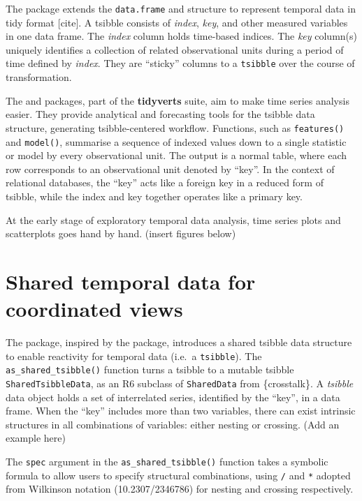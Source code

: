The  package extends the \texttt{data.frame} and
 structure to represent temporal data in tidy format
{[}cite{]}. A tsibble consists of \emph{index}, \emph{key}, and other
measured variables in one data frame. The \emph{index} column holds
time-based indices. The \emph{key} column(s) uniquely identifies a
collection of related observational units during a period of time
defined by \emph{index}. They are ``sticky'' columns to a
\texttt{tsibble} over the course of transformation.

The  and  packages, part of the
\textbf{tidyverts} suite, aim to make time series analysis easier. They
provide analytical and forecasting tools for the tsibble data structure,
generating tsibble-centered workflow. Functions, such as
\texttt{features()} and \texttt{model()}, summarise a sequence of
indexed values down to a single statistic or model by every
observational unit. The output is a normal table, where each row
corresponds to an observational unit denoted by ``key''. In the context
of relational databases, the ``key'' acts like a foreign key in a
reduced form of tsibble, while the index and key together operates like
a primary key.

At the early stage of exploratory temporal data analysis, time series
plots and scatterplots goes hand by hand. (insert figures below)

\hypertarget{shared-temporal-data-for-coordinated-views}{%
\section{Shared temporal data for coordinated
views}\label{shared-temporal-data-for-coordinated-views}}

The  package, inspired by the 
package, introduces a shared tsibble data structure to enable reactivity
for temporal data (i.e.~a \texttt{tsibble}). The
\texttt{as\_shared\_tsibble()} function turns a tsibble to a mutable
tsibble \texttt{SharedTsibbleData}, as an R6 subclass of
\texttt{SharedData} from \{crosstalk\}. A \emph{tsibble} data object
holds a set of interrelated series, identified by the ``key'', in a data
frame. When the ``key'' includes more than two variables, there can
exist intrinsic structures in all combinations of variables: either
nesting or crossing. (Add an example here)

The \texttt{spec} argument in the \texttt{as\_shared\_tsibble()}
function takes a symbolic formula to allow users to specify structural
combinations, using \texttt{/} and \texttt{*} adopted from Wilkinson
notation (10.2307/2346786) for nesting and crossing respectively.

